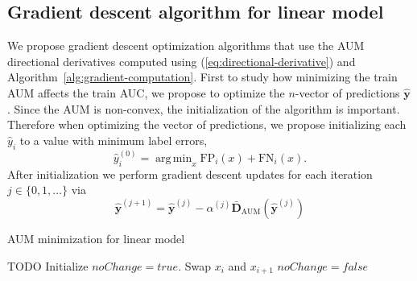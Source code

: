 \documentclass{article}
\DeclareMathOperator*{\argmin}{arg\, min}
\begin{document}
\subsection{Gradient descent algorithm for linear model}
\label{sec:gradient-descent}

We propose gradient descent optimization algorithms that use the AUM directional derivatives computed using (\ref{eq:directional-derivative}) and Algorithm~\ref{alg:gradient-computation}.
First to study how minimizing the train AUM affects the train AUC, we propose to optimize the $n$-vector of predictions $\mathbf{\hat{y}}$.
Since the AUM is non-convex, the initialization of the algorithm is important. Therefore when optimizing the vector of predictions, we propose initializing each $\hat y_i$ to a value with minimum label errors, 
\begin{equation}
    \hat y_i^{(0)} = \argmin_x 
    \text{FP}_i(x) + 
    \text{FN}_i(x).
\end{equation}
After initialization we perform gradient descent updates for each iteration $j\in\{0,1,\dots\}$ via
\begin{equation}
    \mathbf{\hat y}^{(j+1)} = \mathbf{\hat y}^{(j)} - \alpha^{(j)} \mathbf {\bar D}_\text{AUM}(\mathbf {\hat y}^{(j)})
\end{equation}

\begin{algorithm}[tb]
   \caption{AUM minimization for linear model}
   \label{alg:linear-model}
\begin{algorithmic}
    TODO
   \REPEAT
   \STATE Initialize $noChange = true$.
   \STATE Swap $x_i$ and $x_{i+1}$
   \STATE $noChange = false$
   \ENDIF
   \ENDFOR
\end{algorithmic}
\end{algorithm}
\end{document}

